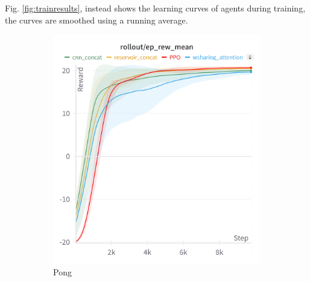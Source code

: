 Fig. \ref{fig:trainresults}, instead shows the learning curves of agents during training, the curves are smoothed using a running average.

\begin{figure}[htbp]
    \centering
    \begin{subfigure}[b]{0.32\textwidth}
        \centering
        \includegraphics[width=\textwidth]{images/pong_train.png}
        \caption{Pong}
        \label{fig:pongtraining}
    \end{subfigure}
    \hfill
    \begin{subfigure}[b]{0.32\textwidth}
        \centering

\end{subfigure}
\end{figure}
